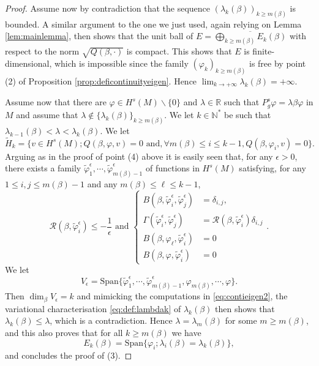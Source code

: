 \documentclass[10pt]{amsart}
\numberwithin{equation}{section}
\newcommand{\R}{\mathbb{R}}
\newcommand{\N}{\mathbb{N}}
\def\ep{{\varepsilon}}
\newcommand{\vp}{\varphi}
\def \ep{\epsilon}
\theoremstyle{plain}
\theoremstyle{remark}
\begin{document}
\begin{proof}
Assume now by contradiction that the sequence $(\lambda_k(\beta))_{k\ge m(\beta)}$ is bounded. A similar argument to the one we just used, again relying on Lemma \ref{lem:mainlemma}, then shows that the unit ball of $E = \overline{\bigoplus_{k\geq m(\beta)} E_k(\beta)}$ with respect to the norm $\sqrt{Q(\beta,\cdot)}$ is compact. This shows that $E$ is finite-dimensional, which is impossible since the family $(\vp_k)_{k\ge m(\beta)}$ is free by point (2) of Proposition  \ref{prop:deficontinuityeigen}. Hence $\lim_{k \to +\infty} \lambda_k(\beta) = + \infty$. 

Assume now that there are $\vp\in H^s(M) \backslash \{0\}$ and $\lambda\in \R$ such that $P_g^s \vp = \lambda \beta \vp$ in $M$ and assume that $\lambda \not \in \{\lambda_k(\beta)\}_{k \ge m(\beta)}$. We let $k \in \N^*$ be such that $\lambda_{k-1}(\beta)<  \lambda < \lambda_k(\beta) $. We let 
$$ \tilde{H}_k = \Big \{ v \in H^s(M) ; Q(\beta, \vp, v) = 0 \text{ and}, \forall m(\beta)\leq i \leq k-1,  Q(\beta,\vp_i,v) = 0  \Big \} .$$
Arguing as in the proof of point (4) above it is easily seen that, for any $\epsilon >0$, there exists a family $\tilde{\vp}_1^{\epsilon}, \cdots, \tilde{\vp}_{m(\beta)-1}^{\epsilon}$ of functions in $H^s(M)$ satisfying, for any $ 1 \leq i,j \leq m(\beta)-1$ and any  $m(\beta) \leq \ell \leq k-1$,
$$
 \mathcal{R}(\beta,\tilde{\vp}_i^{\epsilon})  \leq -\frac{1}{\epsilon} \text{ and } \left \{
 \begin{aligned}
B(\beta,\tilde{\vp}_i^{\epsilon},\tilde{\vp}_j^{\epsilon}) & = \delta_{i,j}, \\
\Gamma(\tilde{\vp}_i^{\epsilon},\tilde{\vp}_j^{\epsilon}) & = \mathcal{R}(\beta,\tilde{\vp}_i^{\epsilon}) \delta_{i,j} \\
  B(\beta,\vp_\ell, \tilde{\vp}_i^{\epsilon}) & = 0 \\
  B(\beta, \vp,  \tilde{\vp}_i^{\epsilon})& = 0
 \end{aligned}\right. . $$
We let
$$V_{\epsilon}  = \text{Span} \Big \{ \tilde{\vp}_1^{\epsilon},\cdots,\tilde{\vp}_{m(\beta)-1}^{\epsilon},\vp_{m(\beta)},\cdots, \vp \Big \}. $$
Then $\dim_{\beta} V_\ep = k$ and mimicking the computations in \eqref{eq:contieigen2}, the variational characterisation \eqref{eq:def:lambdak} of $\lambda_k(\beta)$ then shows that $\lambda_k(\beta) \le \lambda$, which is a contradiction. Hence $\lambda = \lambda_m(\beta)$ for some $m \ge m(\beta)$, and this also proves that for all $k \ge m(\beta)$ we have 
$$ E_k(\beta) = \text{Span} \Big \{  \vp_i ; \lambda_i(\beta) = \lambda_k(\beta) \Big \}, $$
and concludes the proof of (3). 


\end{proof}
\end{document}
